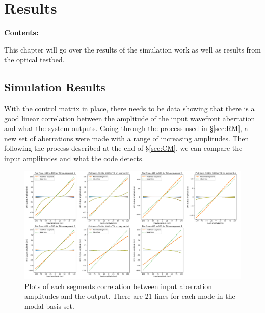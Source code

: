 \chapter{Results} %
\noindent\textbf{\large Contents:}

\noindent\hrulefill
\noindent\startcontents[chapters]
\noindent{}
\noindent\hrulefill
\label{Chapter4}


This chapter will go over the results of the simulation work as well as results from the optical testbed.

\section{Simulation Results}
\label{sec:sim}

With the control matrix in place, there needs to be data showing that there is a good linear correlation between the amplitude of the input wavefront aberration and what the system outputs.  Going through the process used in \S \ref{sec:RM}, a new set of aberrations were made with a range of increasing amplitudes.   Then following the process described at the end of \S \ref{sec:CM}, we can compare the input amplitudes and what the code detects.  

\begin{figure}[H]
    \centering
    \includegraphics[width = 14cm]{Figures/Tilt_response100.png}
    \caption{Plots of each segments correlation between input aberration amplitudes and the output.  There are 21 lines for each mode in the modal basis set.}
    \label{fig:Tilt_100}
\end{figure}

